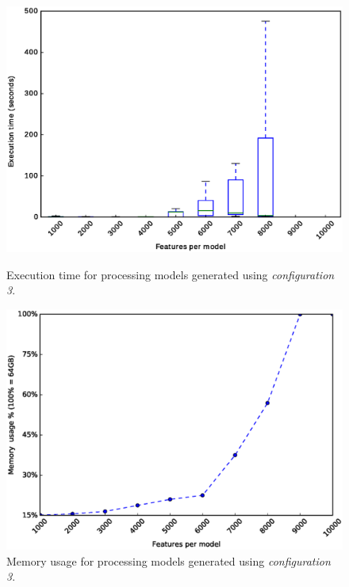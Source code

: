 \begin{figure}[h]
	\centering
	\begin{minipage}[b]{0.48\textwidth}
		\includegraphics[width=\textwidth]{boxplot_0_5.eps}
		\caption{Execution time for processing models generated using \textit{configuration 3}.}\label{fig:plot:probs:boxplot_0_5}
	\end{minipage}
	\hfill
	\begin{minipage}[b]{0.48\textwidth}
		\includegraphics[width=\textwidth]{boxplot_0_5_mem.eps}
		\caption{Memory usage for processing models generated using \textit{configuration 3}.}\label{fig:plot:probs:boxplot_0_5_mem}
	\end{minipage}
\end{figure}


